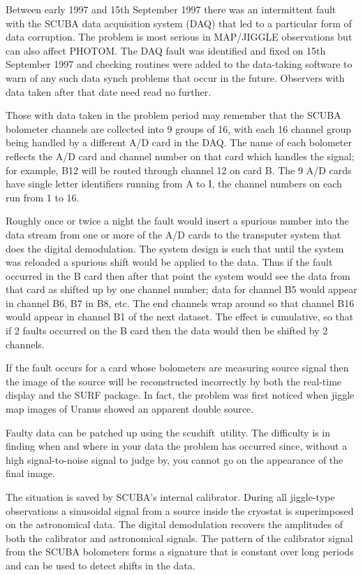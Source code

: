 \documentclass[twoside,11pt]{article}
\newcommand{\task}[1]{{\sf #1}}
\newcommand{\scushift}{\htmlref{\task{scushift}}{SCUSHIFT}}
\newcommand{\htmlref}[2]{#1}
\begin{document}
Between early 1997 and 15th September 1997 there was an intermittent fault
with the SCUBA data acquisition system (DAQ) that led to a particular form of
data corruption. The problem is most serious in MAP/JIGGLE observations but
can also affect PHOTOM. The DAQ fault was identified and fixed on 15th
September 1997 and checking routines were added to the data-taking software to
warn of any such data synch problems that occur in the future.  Observers with
data taken after that date need read no further.

Those with data taken in the problem period may remember that the
SCUBA bolometer channels are collected into 9 groups of 16, with each 16
channel group being handled by a different A/D card in the DAQ. The name
of each bolometer reflects the A/D card and channel number on that card
which handles the signal; for example, B12 will be routed through channel
12 on card B. The 9 A/D cards have single letter identifiers running from
A to I, the channel numbers on each run from 1 to 16.

Roughly once or twice a night the fault would insert a spurious number
into the data stream from one or more of the A/D cards to the transputer
system that does the digital demodulation. The system design is such that
until the system was reloaded a spurious shift would be applied to the
data. Thus if the fault occurred in the B card then after that point the
system would see the data from that card as shifted up by one channel
number; data for channel B5 would appear in channel B6, B7 in B8, etc. The
end channels wrap around so that channel B16 would appear in channel B1 of
the next dataset. The effect is cumulative, so that if 2 faults occurred
on the B card then the data would then be shifted by 2 channels.

If the fault occurs for a card whose bolometers are measuring source
signal then the image of the source will be reconstructed incorrectly by
both the real-time display and the SURF package. In fact, the problem was
first noticed when jiggle map images of Uranus showed an apparent double
source.

Faulty data can be patched up using the \scushift\  utility. The difficulty is 
in finding when and where in your data the problem has occurred since,
without a high signal-to-noise signal to judge by, you cannot go on the
appearance of the final image.

The situation is saved by SCUBA's internal calibrator. During all
jiggle-type observations a sinusoidal signal from a source inside the
cryostat is superimposed on the astronomical data. The digital
demodulation recovers the amplitudes of both the calibrator and
astronomical signals. The pattern of the calibrator signal from the SCUBA
bolometers forms a signature that is constant over long periods and can be
used to detect shifts in the data.
\end{document}
